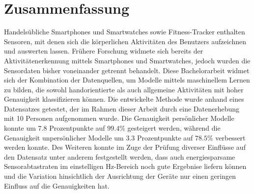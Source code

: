 \chapter*{Zusammenfassung}
Handelsübliche Smartphones und Smartwatches sowie Fitness-Tracker enthalten Sensoren, mit denen sich die körperlichen Aktivitäten des Benutzers aufzeichnen und auswerten lassen. Frühere Forschung widmete sich bereits der Aktivitätenerkennung mittels Smartphones und Smartwatches, jedoch wurden die Sensordaten bisher voneinander getrennt behandelt. Diese Bachelorarbeit widmet sich der Kombination der Datenquellen, um Modelle mittels maschinellem Lernen zu bilden, die sowohl handorientierte als auch allgemeine Aktivitäten mit hoher Genauigkeit klassifizieren können. Die entwickelte Methode wurde anhand eines Datensatzes getestet, der im Rahmen dieser Arbeit durch eine Datenerhebung mit 10 Personen aufgenommen wurde. Die Genauigkeit persönlicher Modelle konnte um 7.8 Prozentpunkte auf $99.4 \%$ gesteigert werden, während die Genauigkeit unpersönlicher Modelle um 3.3 Prozentpunkte auf $78.5 \%$ verbessert werden konnte. Des Weiteren konnte im Zuge der Prüfung diverser Einflüsse auf den Datensatz unter anderem festgestellt werden, dass auch energiesparsame Sensorabtastraten im einstelligen Hz-Bereich noch gute Ergebnise liefern können und die Variation hinsichtlich der Ausrichtung der Geräte nur einen geringen Einfluss auf die Genauigkeiten hat.

